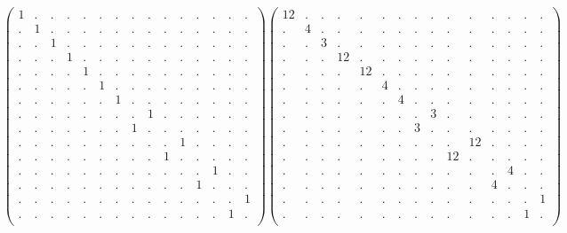 \documentclass[12pt,a4paper]{amsart}
\begin{document}
\begin{align*}
\left(\begin{array}{rrrrrrrrrrrrrrr}%
1&.&.&.&.&.&.&.&.&.&.&.&.&.&.\\%
.&1&.&.&.&.&.&.&.&.&.&.&.&.&.\\%
.&.&1&.&.&.&.&.&.&.&.&.&.&.&.\\%
.&.&.&1&.&.&.&.&.&.&.&.&.&.&.\\%
.&.&.&.&1&.&.&.&.&.&.&.&.&.&.\\%
.&.&.&.&.&1&.&.&.&.&.&.&.&.&.\\%
.&.&.&.&.&.&1&.&.&.&.&.&.&.&.\\%
.&.&.&.&.&.&.&.&1&.&.&.&.&.&.\\%
.&.&.&.&.&.&.&1&.&.&.&.&.&.&.\\%
.&.&.&.&.&.&.&.&.&.&1&.&.&.&.\\%
.&.&.&.&.&.&.&.&.&1&.&.&.&.&.\\%
.&.&.&.&.&.&.&.&.&.&.&.&1&.&.\\%
.&.&.&.&.&.&.&.&.&.&.&1&.&.&.\\%
.&.&.&.&.&.&.&.&.&.&.&.&.&.&1\\%
.&.&.&.&.&.&.&.&.&.&.&.&.&1&.\\%
\end{array}\right)%
\left(\begin{array}{rrrrrrrrrrrrrrr}%
12&.&.&.&.&.&.&.&.&.&.&.&.&.&.\\%
.&4&.&.&.&.&.&.&.&.&.&.&.&.&.\\%
.&.&3&.&.&.&.&.&.&.&.&.&.&.&.\\%
.&.&.&12&.&.&.&.&.&.&.&.&.&.&.\\%
.&.&.&.&12&.&.&.&.&.&.&.&.&.&.\\%
.&.&.&.&.&4&.&.&.&.&.&.&.&.&.\\%
.&.&.&.&.&.&4&.&.&.&.&.&.&.&.\\%
.&.&.&.&.&.&.&.&3&.&.&.&.&.&.\\%
.&.&.&.&.&.&.&3&.&.&.&.&.&.&.\\%
.&.&.&.&.&.&.&.&.&.&12&.&.&.&.\\%
.&.&.&.&.&.&.&.&.&12&.&.&.&.&.\\%
.&.&.&.&.&.&.&.&.&.&.&.&4&.&.\\%
.&.&.&.&.&.&.&.&.&.&.&4&.&.&.\\%
.&.&.&.&.&.&.&.&.&.&.&.&.&.&1\\%
.&.&.&.&.&.&.&.&.&.&.&.&.&1&.\\%
\end{array}\right)%
\end{align*}
\end{document}
